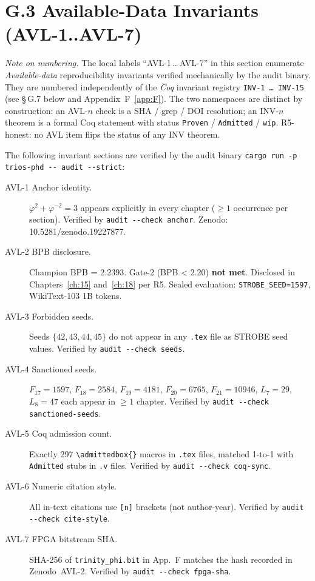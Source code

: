 \section*{G.3 Available-Data Invariants (AVL-1..AVL-7)}

\textit{Note on numbering.} The local labels ``AVL-1\,\ldots\,AVL-7'' in this
section enumerate \emph{Available-data} reproducibility invariants verified
mechanically by the audit binary. They are numbered independently of the
\emph{Coq} invariant registry \texttt{INV-1\,\ldots\,INV-15} (see
\S\,G.7 below and Appendix~F~\ref{app:F}). The two
namespaces are distinct by construction: an AVL-$n$ check is a SHA / grep / DOI
resolution; an INV-$n$ theorem is a formal Coq statement with status
\texttt{Proven} / \texttt{Admitted} / \texttt{wip}. R5-honest: no AVL item
flips the status of any INV theorem.



The following invariant sections are verified by the audit binary
\texttt{cargo run -p trios-phd -{}-{} audit -{}-strict}:

\begin{description}
  \item[AVL-1 Anchor identity.] $\varphi^2 + \varphi^{-2} = 3$ appears
    explicitly in every chapter ($\geq 1$ occurrence per section). Verified by
    \texttt{audit -{}-check anchor}. Zenodo: 10.5281/zenodo.19227877.
  \item[AVL-2 BPB disclosure.] Champion BPB = 2.2393. Gate-2 (BPB < 2.20)
    \textbf{not met}. Disclosed in Chapters~\ref{ch:15} and~\ref{ch:18} per R5.
    Sealed evaluation: \texttt{STROBE\_SEED=1597}, WikiText-103 1B tokens.
  \item[AVL-3 Forbidden seeds.] Seeds $\{42, 43, 44, 45\}$ do not appear in any
    \texttt{.tex} file as STROBE seed values. Verified by \texttt{audit -{}-check seeds}.
  \item[AVL-4 Sanctioned seeds.] $F_{17}{=}1597$, $F_{18}{=}2584$, $F_{19}{=}4181$,
    $F_{20}{=}6765$, $F_{21}{=}10946$, $L_7{=}29$, $L_8{=}47$ each appear in $\geq 1$
    chapter. Verified by \texttt{audit -{}-check sanctioned-seeds}.
  \item[AVL-5 Coq admission count.] Exactly 297 \texttt{\textbackslash admittedbox\{\}} macros in
    \texttt{.tex} files, matched 1-to-1 with \texttt{Admitted} stubs in \texttt{.v} files.
    Verified by \texttt{audit -{}-check coq-sync}.
  \item[AVL-6 Numeric citation style.] All in-text citations use \texttt{[n]}
    brackets (not author-year). Verified by \texttt{audit -{}-check cite-style}.
  \item[AVL-7 FPGA bitstream SHA.] SHA-256 of \texttt{trinity\_phi.bit} in
    App.~F matches the hash recorded in Zenodo~AVL-2. Verified by
    \texttt{audit -{}-check fpga-sha}.
\end{description}

